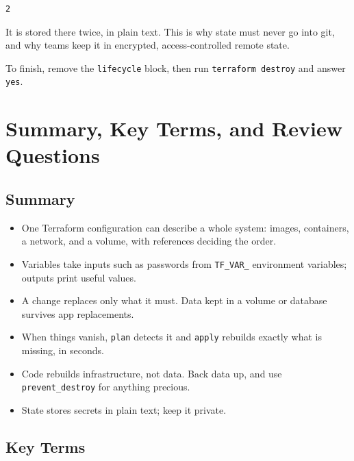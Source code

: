 \begin{codeblock}
\begin{Verbatim}[formatcom=\outputstyle]
2
\end{Verbatim}
\end{codeblock}

It is stored there twice, in plain text. This is why state must never go into git, and why teams keep it in encrypted, access-controlled remote state.

To finish, remove the \texttt{lifecycle} block, then run \texttt{terraform\ destroy} and answer \texttt{yes}.

\section{Summary, Key Terms, and Review Questions}\label{11-lab-rebuild-everything-from-code:summary-key-terms-and-review-questions}

\subsection*{Summary}\label{11-lab-rebuild-everything-from-code:summary}

\begin{itemize}
\tightlist
\item
  One Terraform configuration can describe a whole system: images, containers, a network, and a volume, with references deciding the order.
\item
  Variables take inputs such as passwords from \texttt{TF\_VAR\_} environment variables; outputs print useful values.
\item
  A change replaces only what it must. Data kept in a volume or database survives app replacements.
\item
  When things vanish, \texttt{plan} detects it and \texttt{apply} rebuilds exactly what is missing, in seconds.
\item
  Code rebuilds infrastructure, not data. Back data up, and use \texttt{prevent\_destroy} for anything precious.
\item
  State stores secrets in plain text; keep it private.
\end{itemize}


\subsection*{Key Terms}\label{11-lab-rebuild-everything-from-code:key-terms}

